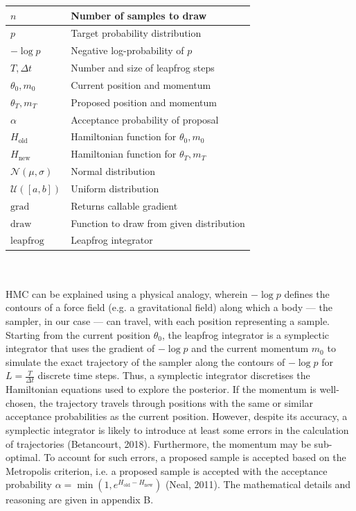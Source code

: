 \documentclass[conference]{IEEEtran}
\begin{document}
\begin{tabular}{| m{1.5cm} | m{6cm} |}
    \hline
    $n$ & Number of samples to draw\\
    \hline
    $p$ & Target probability distribution\\
    \hline
    $-\log p$ & Negative log-probability of $p$\\
    \hline
    $T, \Delta t$ & Number and size of leapfrog steps\\
    \hline
    $\theta_0, m_0$ & Current position and momentum\\
    \hline
    $\theta_T, m_T$ & Proposed position and momentum\\
    \hline
    $\alpha$ & Acceptance probability of proposal\\
    \hline
    $H_\text{old}$ & Hamiltonian function for $\theta_0, m_0$\\
    \hline
    $H_\text{new}$ & Hamiltonian function for $\theta_T, m_T$\\
    \hline
    $\mathcal{N}(\mu, \sigma)$ & Normal distribution\\
    \hline
    $\mathcal{U}([a, b])$ & Uniform distribution\\
    \hline
    $\text{grad}$ & Returns callable gradient\\
    \hline
    $\text{draw}$ & Function to draw from given distribution\\
    \hline
    $\text{leapfrog}$ & Leapfrog integrator\\
    \hline
\end{tabular}\\~\\

HMC can be explained using a physical analogy, wherein $-\log p$ defines the contours of a force field (e.g. a gravitational field) along which a body — the sampler, in our case — can travel, with each position representing a sample. Starting from the current position $\theta_0$, the leapfrog integrator is a symplectic integrator that uses the gradient of $-\log p$ and the current momentum $m_0$ to simulate the exact trajectory of the sampler along the contours of $-\log p$ for $L = \frac{T}{\Delta t}$ discrete time steps. Thus, a symplectic integrator discretises the Hamiltonian equations used to explore the posterior. If the momentum is well-chosen, the trajectory travels through positions with the same or similar acceptance probabilities as the current position. However, despite its accuracy, a symplectic integrator is likely to introduce at least some errors in the calculation of trajectories (Betancourt, 2018). Furthermore, the momentum may be sub-optimal. To account for such errors, a proposed sample is accepted based on the Metropolis criterion, i.e. a proposed sample is accepted with the acceptance probability $\alpha = \min(1, e^{H_\text{old} - H_\text{new}})$ (Neal, 2011). The mathematical details and reasoning are given in appendix B.
\end{document}
